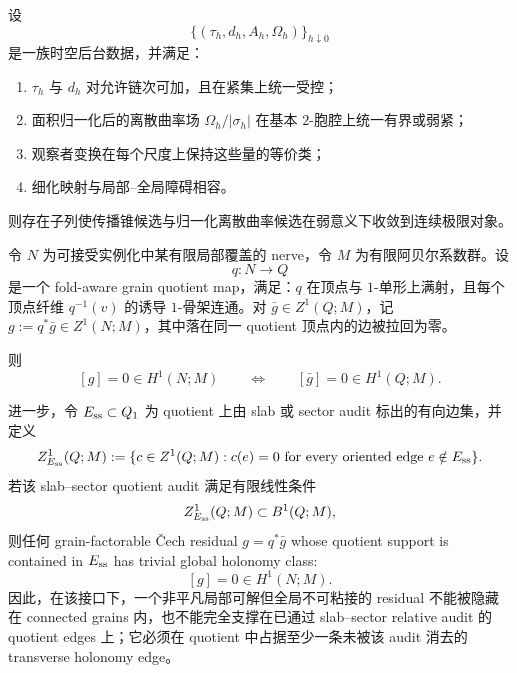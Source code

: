 \begin{proposition}[连续极限的充分模板]\label{prop:physical-spacetime-continuum-limit-template}
设
\[
\{(\tau_h,d_h,A_h,\Omega_h)\}_{h\downarrow 0}
\]
是一族时空后台数据，并满足：
\begin{enumerate}
  \item \(\tau_h\) 与 \(d_h\) 对允许链次可加，且在紧集上统一受控；
  \item 面积归一化后的离散曲率场 \(\Omega_h/|\sigma_h|\) 在基本 \(2\)-胞腔上统一有界或弱紧；
  \item 观察者变换在每个尺度上保持这些量的等价类；
  \item 细化映射与局部--全局障碍相容。
\end{enumerate}
则存在子列使传播锥候选与归一化离散曲率候选在弱意义下收敛到连续极限对象。
\end{proposition}

\begin{proposition}\label{distill:wang_zahl-grain_prism_structure_dichotomy-physical-connected-grain-quotient}
令 \(N\) 为可接受实例化中某有限局部覆盖的 nerve，令 \(M\) 为有限阿贝尔系数群。设
\[
q:N\longrightarrow Q
\]
是一个 fold-aware grain quotient map，满足：\(q\) 在顶点与 \(1\)-单形上满射，且每个顶点纤维 \(q^{-1}(v)\) 的诱导 \(1\)-骨架连通。对 \(\bar g\in Z^1(Q;M)\)，记 \(g:=q^\ast\bar g\in Z^1(N;M)\)，其中落在同一 quotient 顶点内的边被拉回为零。

则
\[
[g]=0\in H^1(N;M)\qquad\Longleftrightarrow\qquad [\bar g]=0\in H^1(Q;M).
\]

进一步，令 \(E_{\rm ss}\subset Q_1\) 为 quotient 上由 slab 或 sector audit 标出的有向边集，并定义
\[
Z^1_{E_{\rm ss}}(Q;M)
:=
\{c\in Z^1(Q;M):c(e)=0\text{ for every oriented edge }e\notin E_{\rm ss}\}.
\]
若该 slab--sector quotient audit 满足有限线性条件
\[
Z^1_{E_{\rm ss}}(Q;M)\subset B^1(Q;M),
\]
则任何 grain-factorable \v Cech residual \(g=q^\ast\bar g\) whose quotient support is contained in \(E_{\rm ss}\) has trivial global holonomy class:
\[
[g]=0\in H^1(N;M).
\]
因此，在该接口下，一个非平凡局部可解但全局不可粘接的 residual 不能被隐藏在 connected grains 内，也不能完全支撑在已通过 slab--sector relative audit 的 quotient edges 上；它必须在 quotient 中占据至少一条未被该 audit 消去的 transverse holonomy edge。
\end{proposition}


